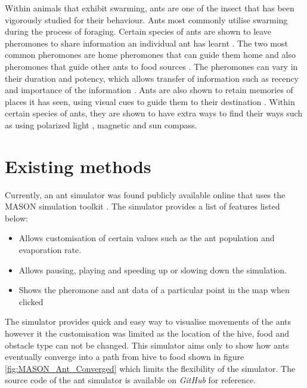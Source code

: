 \documentclass[a4paper, oneside, 11pt]{report}
\begin{document}
Within animals that exhibit swarming, ants are one of the insect that has been vigorously studied for their behaviour. Ants most commonly utilise swarming during the process of foraging. Certain species of ants are shown to leave pheromones to share information an individual ant has learnt \citep{Ant_Pheromones}. The two most common pheromones are home pheromones that can guide them home and also pheromones that guide other ants to food sources \citep{Ant_Pheromones}. The pheromones can vary in their duration and potency, which allows transfer of information such as recency and importance of the information \citep{Ant_Pheromones}. Ants are also shown to retain memories of places it has seen, using visual cues to guide them to their destination \citep{Ant_Memory_1} \cite{Ant_Memory_2} \cite{Ant_Memory_3}. Within certain species of ants, they are shown to have extra ways to find their ways such as using polarized light \citep{Ant_Navigation_Light}, magnetic \citep{Ant_Navigation_Magnetic_1} \cite{Ant_Navigation_Magnetic_2} and sun \citep{Ant_Navigation_Wind} compass.


\section{Existing methods}
Currently, an ant simulator was found publicly available online that uses the MASON simulation toolkit \citep{Mason}. The simulator provides a list of features listed below:
\begin{itemize}
	\item Allows customisation of certain values such as the ant population and evaporation rate.
	\item Allows pausing, playing and speeding up or slowing down the simulation.
	\item Shows the pheromone and ant data of a particular point in the map when clicked
\end{itemize}

The simulator provides quick and easy way to visualise movements of the ants however it the customisation was limited as the location of the hive, food and obstacle type can not be changed. This simulator aims only to show how ants eventually converge into a path from hive to food shown in figure \ref{fig:MASON_Ant_Converged} which limits the flexibility of the simulator. The source code of the ant simulator is available on \textit{GitHub} for reference.
\end{document}
